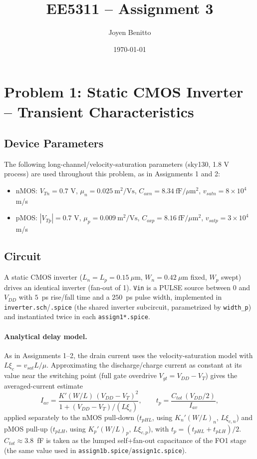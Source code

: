 \title{EE5311 -- Assignment 3}
\author{Joyen Benitto}
\date{\today}
\maketitle

\section{Problem 1: Static CMOS Inverter -- Transient Characteristics}

\subsection*{Device Parameters}

The following long-channel/velocity-saturation parameters (sky130, 1.8 V
process) are used throughout this problem, as in Assignments 1 and 2:

\begin{itemize}
  \item nMOS: $V_{Tn} = 0.7$ V, $\mu_n = 0.025\ \text{m}^2/\text{Vs}$, $C_{oxn} =
  8.34\ \text{fF}/\mu\text{m}^2$, $v_{satn} = 8\times10^4$ m/s
  \item pMOS: $|V_{Tp}| = 0.7$ V, $\mu_p = 0.009\ \text{m}^2/\text{Vs}$, $C_{oxp}
  = 8.16\ \text{fF}/\mu\text{m}^2$, $v_{satp} = 3\times10^4$ m/s
\end{itemize}

\subsection*{Circuit}

A static CMOS inverter ($L_n=L_p=0.15\ \mu\text{m}$, $W_n=0.42\ \mu\text{m}$
fixed, $W_p$ swept) drives an identical inverter (fan-out of 1). \texttt{Vin}
is a PULSE source between $0$ and $V_{DD}$ with $5$~ps rise/fall time and a
$250$~ps pulse width, implemented in \texttt{inverter.sch}/\texttt{.spice}
(the shared inverter subcircuit, parametrized by \texttt{width\_p}) and
instantiated twice in each \texttt{assign1*.spice}.

\paragraph{Analytical delay model.} As in Assignments 1--2, the drain current
uses the velocity-saturation model with $L\xi_c = v_{sat}L/\mu$. Approximating
the discharge/charge current as constant at its value near the switching point
(full gate overdrive $V_{gt}=V_{DD}-V_T$) gives the averaged-current estimate
\[
I_{av} = \frac{K'(W/L)\,(V_{DD}-V_T)^2}{1 + (V_{DD}-V_T)/(L\xi_c)},
\qquad
t_p = \frac{C_{tot}\,(V_{DD}/2)}{I_{av}},
\]
applied separately to the nMOS pull-down ($t_{pHL}$, using $K_n'(W/L)_n$,
$L\xi_{c,n}$) and pMOS pull-up ($t_{pLH}$, using $K_p'(W/L)_p$,
$L\xi_{c,p}$), with $t_p=(t_{pHL}+t_{pLH})/2$. $C_{tot}\approx3.8$~fF is taken
as the lumped self+fan-out capacitance of the FO1 stage (the same value used
in \texttt{assign1b.spice}/\texttt{assign1c.spice}).

